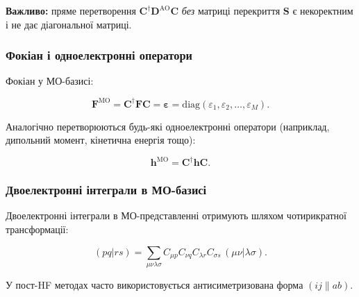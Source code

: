 \textbf{Важливо:} пряме перетворення $\mathbf{C}^\dagger \mathbf{D}^{\text{AO}} \mathbf{C}$
\textit{без} матриці перекриття $\mathbf{S}$ є некоректним і не дає діагональної матриці.


\subsubsection{Фокіан і одноелектронні оператори}

Фокіан у МО-базисі:

\begin{equation}
    \mathbf{F}^{\text{MO}} = \mathbf{C}^\dagger \mathbf{F} \mathbf{C}
    = \boldsymbol{\varepsilon}
    = \mathrm{diag}(\varepsilon_1,\varepsilon_2,\dots,\varepsilon_M).
\end{equation}

Аналогічно перетворюються будь-які одноелектронні оператори (наприклад, дипольний момент, кінетична енергія тощо):

\begin{equation}
    \mathbf{h}^{\text{MO}} = \mathbf{C}^\dagger \mathbf{h} \mathbf{C}.
\end{equation}

\subsubsection{Двоелектронні інтеграли в МО-базисі}

Двоелектронні інтеграли в МО-представленні отримують шляхом чотирикратної трансформації:

\begin{equation}\label{eq:MO_eri}
    (pq|rs)
    = \sum_{\mu\nu\lambda\sigma}
      C_{\mu p} C_{\nu q} C_{\lambda r} C_{\sigma s}\,
      (\mu\nu|\lambda\sigma).
\end{equation}

У пост-HF методах часто використовується антисиметризована форма $(ij\|ab)$.

